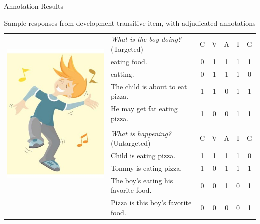 \documentclass[final,t]{beamer}
\begin{document}
\begin{frame}{}
\begin{columns}[t]
\begin{column}{.33\linewidth}
\begin{block}{Annotation Results}
\begin{center}
\begin{minipage}{.85\textwidth}
\begin{table}[htb!]
\begin{center}
\begin{tabular}{|l||l|c|c|c|c|c|}
\hline
\multirow{10}{*}{\includegraphics[width=0.25\columnwidth]{../figures/I01.jpg}}& \textit{What is the boy doing?} (Targeted) & C & V & A & I & G \\
\cline{2-7}
\cline{2-7}
& eating food. & 0 & 1 & 1 & 1 & 1 \\
\cline{2-7}
& eatting. & 0 & 1 & 1 & 1 & 0 \\
\cline{2-7}
& The child is about to eat pizza. & 1 & 1 & 0 & 1 & 1 \\
\cline{2-7}
& He may get fat eating pizza. & 1 & 0 & 0 & 1 & 1 \\
\cline{2-7}
& \multicolumn{6}{c|}{} \\
\cline{2-7}
& \textit{What is happening?} (Untargeted) & C & V & A & I & G \\
\cline{2-7}
\cline{2-7}
& Child is eating pizza. & 1 & 1 & 1 & 1 & 0 \\
\cline{2-7}
& Tommy is eating pizza. & 1 & 0 & 1 & 1 & 1 \\
\cline{2-7}
& The boy's eating his favorite food. & 0 & 0 & 1 & 0 & 1 \\
\cline{2-7}
& Pizza is this boy's favorite food. & 0 & 0 & 0 & 0 & 1 \\
\hline
\end{tabular}
\caption{\label{tab:devo-transitive} Sample responses from development transitive item, with adjudicated annotations} %
\end{center}
\end{table}


\end{minipage}
\end{center}
\end{block}
\end{column}
\end{columns}
\end{frame}
\end{document}
